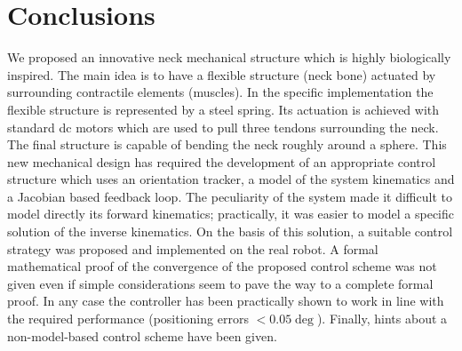 \documentclass[conference]{IEEEtran}
\numberwithin{equation}{section}
\begin{document}
\section{Conclusions} \label{Sec:Conclusions}
We proposed an innovative neck mechanical structure which is highly biologically inspired. The main idea is to have a flexible structure (neck bone) actuated by surrounding contractile elements (muscles). In the specific implementation the flexible structure is represented by a steel spring. Its actuation is achieved with standard dc motors which are used to pull three tendons surrounding the neck. The final structure is capable of bending the neck roughly around a sphere. This new mechanical design has required the development of an appropriate control structure which uses an orientation tracker, a model of the system kinematics and a Jacobian based feedback loop. The peculiarity of the system made it difficult to model directly its forward kinematics; practically, it was easier to model a specific solution of the inverse kinematics. On the basis of this solution, a suitable control strategy was proposed and implemented on the real robot. A formal mathematical proof of the convergence of the proposed control scheme was not given even if simple considerations seem to pave the way to a complete formal proof. In any case the controller has been practically shown to work in line with the required performance (positioning errors $<0.05 \deg$). Finally, hints about a non-model-based control scheme have been given.


\end{document}
